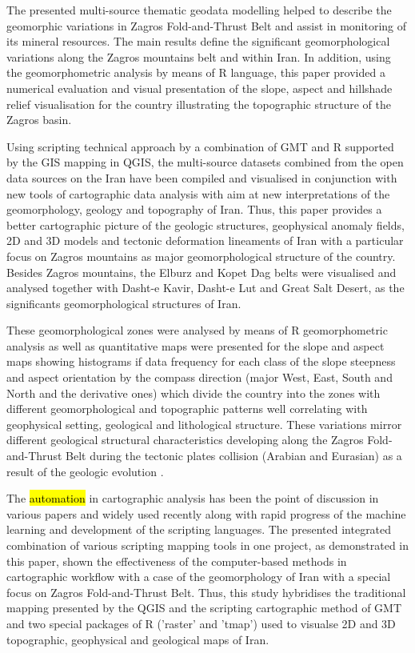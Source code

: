 \documentclass[12pt,a4paper,oneside]{article}
\def \newpar{\vspace{6pt}}
\begin{document}
\newpar The presented multi-source thematic geodata modelling helped to describe the geomorphic variations in Zagros Fold-and-Thrust Belt and assist in monitoring of its mineral resources. The main results define the significant geomorphological variations along the Zagros mountains belt and within Iran. In addition, using the geomorphometric analysis by means of R language, this paper provided a numerical evaluation and visual presentation of the slope, aspect and hillshade relief visualisation for the country illustrating the topographic structure of the Zagros basin.

\newpar Using scripting technical approach by a combination of GMT and R supported by the GIS mapping in QGIS, the multi-source datasets combined from the open data sources on the Iran have been compiled and visualised in conjunction with new tools of cartographic data analysis with aim at new interpretations of the geomorphology, geology and topography of Iran. Thus, this paper provides a better cartographic picture of the geologic structures, geophysical anomaly fields, 2D and 3D models and tectonic deformation lineaments of Iran with a particular focus on Zagros mountains as major geomorphological structure of the country. Besides Zagros mountains, the Elburz and Kopet Dag belts were visualised and analysed together with Dasht-e Kavir, Dasht-e Lut and Great Salt Desert, as the significants geomorphological structures of Iran. 

\newpar These geomorphological zones were analysed by means of R geomorphometric analysis as well as quantitative maps were presented for the slope and aspect maps showing histograms if data frequency for each class of the slope steepness and aspect orientation by the compass direction (major West, East, South and North and the derivative ones) which divide the country into the zones with different geomorphological and topographic patterns well correlating with geophysical setting, geological and lithological structure. These variations mirror different geological structural characteristics developing along the Zagros Fold-and-Thrust Belt during the tectonic plates collision (Arabian and Eurasian) as a result of the geologic evolution \citep{SCHOENBOHM2022120}. 

\newpar The \hl{automation} in cartographic analysis has been the point of discussion in various papers \citep{4779020,Lemenkova202205,384853,Lemenkova2019c,Lemenkova202213,1526600,Lemenkova202206,529693} and widely used recently along with rapid progress of the machine learning and development of the scripting languages. The presented integrated combination of various scripting mapping tools in one project, as demonstrated in this paper, shown the effectiveness of the computer-based methods in cartographic workflow with a case of the geomorphology of Iran with a special focus on Zagros Fold-and-Thrust Belt. Thus, this study hybridises the traditional mapping presented by the QGIS and the scripting cartographic method of GMT and two special packages of R ('raster' and 'tmap') used to visualse 2D and 3D topographic, geophysical and geological maps of Iran. 
\end{document}
